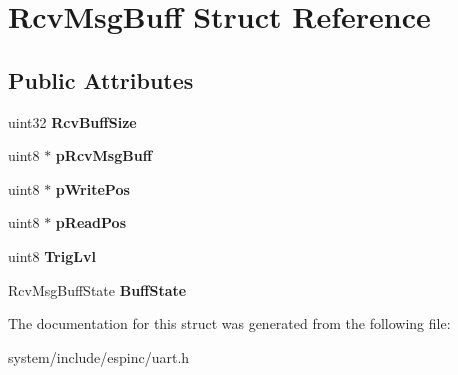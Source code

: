 \hypertarget{struct_rcv_msg_buff}{}\section{Rcv\+Msg\+Buff Struct Reference}
\label{struct_rcv_msg_buff}
\subsection*{Public Attributes}
\begin{DoxyCompactItemize}
\item 
\hypertarget{struct_rcv_msg_buff_a100e2cdf15349ae18fca2fbb67d5845b}{}uint32 {\bfseries Rcv\+Buff\+Size}\label{struct_rcv_msg_buff_a100e2cdf15349ae18fca2fbb67d5845b}

\item 
\hypertarget{struct_rcv_msg_buff_a62921396b7988d167cdbfadaeaafa1ad}{}uint8 $\ast$ {\bfseries p\+Rcv\+Msg\+Buff}\label{struct_rcv_msg_buff_a62921396b7988d167cdbfadaeaafa1ad}

\item 
\hypertarget{struct_rcv_msg_buff_adcdca9d20078d517946d66d355579693}{}uint8 $\ast$ {\bfseries p\+Write\+Pos}\label{struct_rcv_msg_buff_adcdca9d20078d517946d66d355579693}

\item 
\hypertarget{struct_rcv_msg_buff_aee50309a2497fffef33577ab901fe2cc}{}uint8 $\ast$ {\bfseries p\+Read\+Pos}\label{struct_rcv_msg_buff_aee50309a2497fffef33577ab901fe2cc}

\item 
\hypertarget{struct_rcv_msg_buff_a142735d44b7fefc09c930d58b5e70d4d}{}uint8 {\bfseries Trig\+Lvl}\label{struct_rcv_msg_buff_a142735d44b7fefc09c930d58b5e70d4d}

\item 
\hypertarget{struct_rcv_msg_buff_a834e373c1fa1798f35fa38fd197674e0}{}Rcv\+Msg\+Buff\+State {\bfseries Buff\+State}\label{struct_rcv_msg_buff_a834e373c1fa1798f35fa38fd197674e0}

\end{DoxyCompactItemize}


The documentation for this struct was generated from the following file\+:\begin{DoxyCompactItemize}
\item 
system/include/espinc/uart.\+h\end{DoxyCompactItemize}
